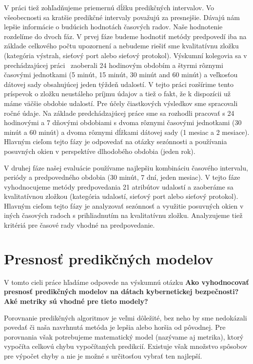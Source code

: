 \documentclass[thesismargins, thesislinespacing, openright, upjsfrontpage, combineabstracts]{rnthesis}
\begin{document}
V práci tiež zohľadňujeme priemernú dĺžku predikčných intervalov. Vo všeobecnosti sa kratšie predikčné intervaly považujú za presnejšie. Dávajú nám lepšie informácie o budúcich hodnotách časových radov. Naše hodnotenie rozdelíme do dvoch fáz. V prvej fáze budeme hodnotiť metódy predpovedí iba na základe celkového počtu upozornení a nebudeme riešiť sme kvalitatívnu zložku (kategória výstrah, sieťový port alebo sieťový protokol). Výskumní kolegovia sa v prechádzajúcej práci~\cite{new_paper} zaoberali 24 hodinovým obdobím a štyrmi rôznymi časovými jednotkami (5 minút, 15 minút, 30 minút and 60 minút) a veľkosťou dátovej sady obsahujúcej jeden týždeň udalostí. V tejto práci rozšírime tento príspevok o zložku neustáleho príjmu údajov a tiež o fakt, že k dispozícii už máme väčšie obdobie udalostí. Pre účely čiastkových výsledkov sme spracovali ročné údaje. Na základe predchádzajúcej práce sme sa rozhodli pracovať s 24 hodinovými a 7 dňovými obdobiami s dvoma rôznymi časovými jednotkami (30 minút a 60 minút) a dvoma rôznymi dĺžkami dátovej sady (1 mesiac a 2 mesiace). Hlavným cieľom tejto fázy je odpovedať na otázky sezónnosti a používania posuvných okien v perspektíve dlhodobého obdobia (jeden rok).

V druhej fáze našej evaluácie používame najlepšiu kombináciu časového intervalu, periódy a predpovedného obdobia (30 minút, 7 dní, jeden mesiac). V tejto fáze vyhodnocujeme metódy predpovedania 21 atribútov udalostí a zaoberáme sa kvalitatívnou zložkou (kategória udalostí, sieťový port alebo sieťový protokol). Hlavným cieľom tejto fázy je analyzovať sezónnosť a využitie posuvných okien v iných časových radoch s prihliadnutím na kvalitatívnu zložku. Analyzujeme tiež kritériá pre časové rady vhodné na predpovedanie.

\section{Presnosť predikčných modelov}
V tomto cieli práce hľadáme odpovede na výskumnú otázku \textbf{Ako vyhodnocovať presnosť predikčných modelov na dátach kybernetickej bezpečnosti? Aké metriky sú vhodné pre tieto modely?}

Porovnanie predikčných algoritmov je veľmi dôležité, bez neho by sme nedokázali povedať či naša navrhnutá metóda je lepšia alebo horšia od pôvodnej. Pre porovnania však potrebujeme matematický model (nazývame aj metrika), ktorý vypočíta celkovú chybu vypočítaných predikcií. Existuje však množstvo spôsobov pre výpočet chyby a nie je možné s určitosťou vybrať ten najlepší. 
\end{document}
